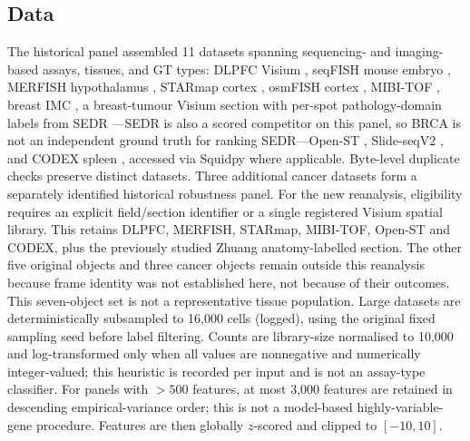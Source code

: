 \documentclass[11pt]{article}
\begin{document}
\subsection{Data}
The historical panel assembled 11 datasets spanning sequencing- and imaging-based assays, tissues, and
GT types: DLPFC Visium \citep{maynard2021dlpfc}, seqFISH mouse embryo
\citep{lohoff2022seqfish}, MERFISH hypothalamus \citep{moffitt2018merfish}, STARmap cortex
\citep{wang2018starmap}, osmFISH cortex \citep{codeluppi2018osmfish}, MIBI-TOF \citep{hartmann2021scmep},
breast IMC \citep{jackson2020imc}, a breast-tumour Visium section \citep{tenx2020brca} with per-spot
pathology-domain labels from SEDR \citep{xu2024sedr}---SEDR is also a scored competitor on this
panel, so BRCA is not an independent ground truth for ranking SEDR---Open-ST \citep{schott2024openst},
Slide-seqV2 \citep{stickels2021slideseq}, and CODEX spleen \citep{goltsev2018codex}, accessed via
Squidpy \citep{palla2022squidpy} where applicable.
Byte-level duplicate checks preserve distinct datasets. Three additional cancer datasets form a separately identified historical robustness panel. For the new reanalysis, eligibility requires an explicit field/section identifier or a single registered Visium spatial library. This retains DLPFC, MERFISH, STARmap, MIBI-TOF, Open-ST and CODEX, plus the previously studied Zhuang anatomy-labelled section. The other five original objects and three cancer objects remain outside this reanalysis because frame identity was not established here, not because of their outcomes. This seven-object set is not a representative tissue population. Large datasets are deterministically subsampled to 16{,}000 cells (logged), using the original fixed sampling seed before label filtering. Counts are
library-size normalised to 10,000 and log-transformed only when all values are nonnegative and numerically integer-valued; this heuristic is recorded per input and is not an assay-type classifier. For panels with $>500$ features, at most 3,000 features are retained in descending empirical-variance order; this is not a model-based highly-variable-gene procedure. Features are then globally $z$-scored and clipped to $[-10,10]$.
\end{document}
